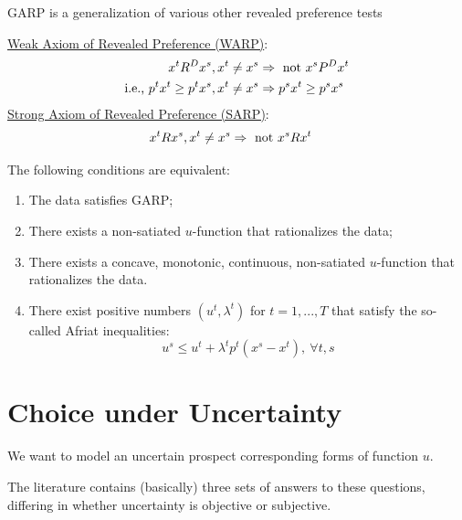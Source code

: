\documentclass[11pt]{elegantbook}
\begin{document}
GARP is a generalization of various other revealed preference tests
\begin{definition}
    \normalfont
    \underline{Weak Axiom of Revealed Preference (WARP)}:
    \begin{equation}
        \begin{aligned}
            x^t R^D x^s,x^t\neq x^s&\Rightarrow\textnormal{ not } x^s P^D x^t\\
            \textnormal{i.e., }p^t x^t \geq p^t x^s,x^t\neq x^s&\Rightarrow p^s x^t\geq p^s x^s
        \end{aligned}
        \nonumber
    \end{equation}
    \underline{Strong Axiom of Revealed Preference (SARP)}:
    \begin{equation}
        \begin{aligned}
            x^t R x^s,x^t\neq x^s&\Rightarrow\textnormal{ not } x^s R x^t
        \end{aligned}
        \nonumber
    \end{equation}
\end{definition}

\begin{theorem}
    The following conditions are equivalent:
    \begin{enumerate}
        \item The data satisfies GARP;
        \item There exists a non-satiated $u$-function that rationalizes the data;
        \item There exists a concave, monotonic, continuous, non-satiated $u$-function that rationalizes the data.
        \item There exist positive numbers $(u^t,\lambda^t)$ for $t=1,...,T$ that satisfy the so-called Afriat inequalities: $$u^s\leq u^t+\lambda^t p^t(x^s-x^t),\ \forall t,s$$
    \end{enumerate}
\end{theorem}



\section{Choice under Uncertainty}
We want to model an uncertain prospect corresponding forms of function $u$.

The literature contains (basically) three sets of answers to these questions, differing in whether uncertainty is objective or subjective.
\end{document}
